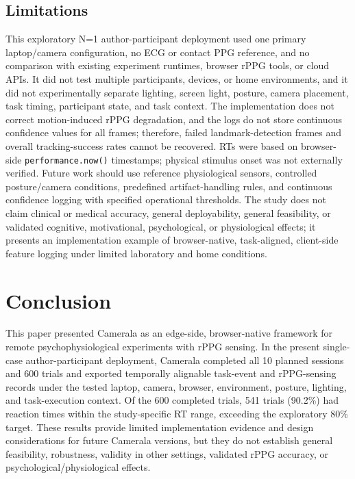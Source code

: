 \documentclass[dvipdfmx]{ehis}
\begin{document}
\subsection{Limitations}
This exploratory N=1 author-participant deployment used one primary laptop/camera configuration, no ECG or contact PPG reference, and no comparison with existing experiment runtimes, browser rPPG tools, or cloud APIs.
It did not test multiple participants, devices, or home environments, and it did not experimentally separate lighting, screen light, posture, camera placement, task timing, participant state, and task context.
The implementation does not correct motion-induced rPPG degradation, and the logs do not store continuous confidence values for all frames; therefore, failed landmark-detection frames and overall tracking-success rates cannot be recovered.
RTs were based on browser-side \texttt{performance.now()} timestamps; physical stimulus onset was not externally verified.
Future work should use reference physiological sensors, controlled posture/camera conditions, predefined artifact-handling rules, and continuous confidence logging with specified operational thresholds.
The study does not claim clinical or medical accuracy, general deployability, general feasibility, or validated cognitive, motivational, psychological, or physiological effects; it presents an implementation example of browser-native, task-aligned, client-side feature logging under limited laboratory and home conditions.

\section{Conclusion}
This paper presented Camerala as an edge-side, browser-native framework for remote psychophysiological experiments with rPPG sensing.
In the present single-case author-participant deployment, Camerala completed all 10 planned sessions and 600 trials and exported temporally alignable task-event and rPPG-sensing records under the tested laptop, camera, browser, environment, posture, lighting, and task-execution context.
Of the 600 completed trials, 541 trials (90.2\%) had reaction times within the study-specific RT range, exceeding the exploratory 80\% target.
These results provide limited implementation evidence and design considerations for future Camerala versions, but they do not establish general feasibility, robustness, validity in other settings, validated rPPG accuracy, or psychological/physiological effects.

\enlargethispage{2\baselineskip}
\end{document}

